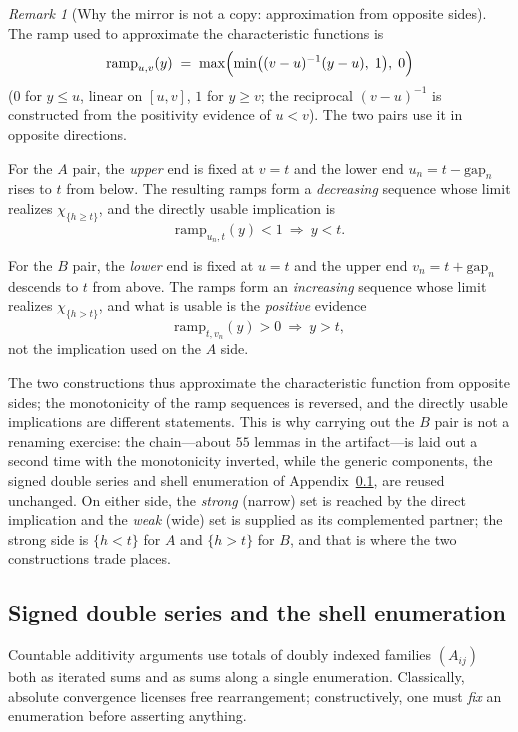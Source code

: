\documentclass[11pt]{article}
\theoremstyle{definition}
\theoremstyle{remark}
\newtheorem{remark}[theorem]{Remark}
\begin{document}
\begin{remark}[Why the mirror is not a copy: approximation from opposite sides]
\label{rem:b-mirrorwhy}
The ramp used to approximate the characteristic functions is
\[
\mathrm{ramp}_{u,v}(y)\;=\;\max\Bigl(\min\bigl((v-u)^{-1}(y-u),\;1\bigr),\;0\Bigr)
\]
($0$ for $y\le u$, linear on $[u,v]$, $1$ for $y\ge v$; the reciprocal $(v-u)^{-1}$ is constructed from the positivity evidence of $u<v$).  The two pairs use it in opposite directions.

For the $A$ pair, the \emph{upper} end is fixed at $v=t$ and the lower end $u_n=t-\mathrm{gap}_n$ rises to $t$ from below.  The resulting ramps form a \emph{decreasing} sequence whose limit realizes $\chi_{\{h\ge t\}}$, and the directly usable implication is
\[
\mathrm{ramp}_{u_n,t}(y)<1\ \Longrightarrow\ y<t .
\]

For the $B$ pair, the \emph{lower} end is fixed at $u=t$ and the upper end $v_n=t+\mathrm{gap}_n$ descends to $t$ from above.  The ramps form an \emph{increasing} sequence whose limit realizes $\chi_{\{h>t\}}$, and what is usable is the \emph{positive} evidence
\[
\mathrm{ramp}_{t,v_n}(y)>0\ \Longrightarrow\ y>t ,
\]
not the implication used on the $A$ side.

The two constructions thus approximate the characteristic function from opposite sides; the monotonicity of the ramp sequences is reversed, and the directly usable implications are different statements.  This is why carrying out the $B$ pair is not a renaming exercise: the chain---about $55$ lemmas in the artifact---is laid out a second time with the monotonicity inverted, while the generic components, the signed double series and shell enumeration of Appendix~\ref{sec:b-series}, are reused unchanged.  On either side, the \emph{strong} (narrow) set is reached by the direct implication and the \emph{weak} (wide) set is supplied as its complemented partner; the strong side is $\{h<t\}$ for $A$ and $\{h>t\}$ for $B$, and that is where the two constructions trade places.
\end{remark}

\subsection{Signed double series and the shell enumeration}
\label{sec:b-series}

Countable additivity arguments use totals of doubly indexed families $(A_{ij})$ both as iterated sums and as sums along a single enumeration.  Classically, absolute convergence licenses free rearrangement; constructively, one must \emph{fix} an enumeration before asserting anything.
\end{document}
